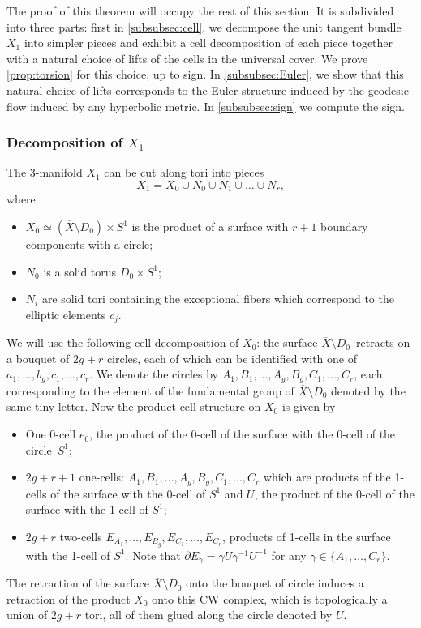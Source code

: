 \documentclass[10pt]{amsart}
\theoremstyle{plain}
\theoremstyle{definition}
\theoremstyle{remark}
\numberwithin{equation}{section}
\begin{document}
The proof of this theorem will occupy the rest of this section. It is subdivided into three parts: first in \cref{subsubsec:cell}, we decompose the unit tangent bundle $X_1$ into simpler pieces and exhibit a cell decomposition of each piece together with a natural choice of lifts of the cells in the universal cover. We prove \cref{prop:torsion} for this choice, up to sign.
In \cref{subsubsec:Euler}, we show that this natural choice of lifts corresponds to the Euler structure induced by the geodesic flow induced by any hyperbolic metric. In \cref{subsubsec:sign} we compute the sign.

\label{subsubsec:cell}

\subsubsection*{Decomposition of $X_1$}
The 3\nobreakdash-manifold $X_1$ can be cut along tori into pieces
\begin{equation}
\label{eq:paste}
X_1 = X_0 \cup N_0 \cup N_1 \cup \ldots \cup N_r,
\end{equation}
where
\begin{itemize}
\item
$X_0 \simeq (\overline X \setminus D_0) \times S^1$ is the product of a surface with $r+1$ boundary components with a circle;
\item $N_0$ is a solid torus $D_0 \times S^1$;
\item $N_i$ are solid tori containing the exceptional fibers which correspond to the elliptic elements $c_j$.
\end{itemize}

We will use the following cell decomposition of $X_0$:
the surface $\overline X \!\setminus\! D_0$~\hbox{retracts} on a bouquet of $2g+r$ circles, each of which can be identified with one of $a_1, \ldots, b_g, c_1, \ldots, c_r$. We denote the circles by $A_1, B_1, \ldots, A_g, B_g, C_1, \ldots, C_r$, each corresponding to the element of the fundamental group of $\overline X \setminus D_0$ denoted by the same tiny letter.
Now the product cell structure on $X_0$ is given by
\begin{itemize}
\item One 0-cell $e_0$, the product of the 0-cell of the surface with the 0-cell of the circle~$S^1$;
\item $2g+r+1$ one-cells: $A_1, B_1, \ldots, A_g, B_g, C_1, \ldots, C_r$ which are products of the 1\nobreakdash-cells of the surface with the 0-cell of $S^1$ and $U$, the product of the 0-cell of the surface with the 1-cell of $S^1$;
\item $2g + r$ two-cells $E_{A_1}, \ldots, E_{B_g}, E_{C_1}, \ldots, E_{C_r}$, products of 1-cells in the surface with the 1-cell of $S^1$. Note that $\partial E_{\gamma} = \gamma U \gamma^{-1} U^{-1}$ for any $\gamma \in \{A_1, \ldots, C_r\}$.
\end{itemize}
The retraction of the surface $\overline X \setminus D_0$ onto the bouquet of circle induces a retraction of the product $X_0$ onto this CW complex, which is topologically a union of $2g+r$ tori, all of them glued along the circle denoted by $U$.
\end{document}
